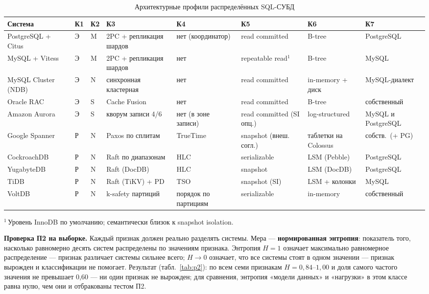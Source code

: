 \documentclass{misisarticle}
\begin{document}
\begin{table}[t]
\caption{Архитектурные профили распределённых SQL-СУБД}\label{tab:profiles}
\centering
\scriptsize
\setlength{\tabcolsep}{3.5pt}
\begin{tabular}{llllllll}
\toprule
\textbf{Система} & \textbf{К1} & \textbf{К2} & \textbf{К3} & \textbf{К4} & \textbf{К5} & \textbf{К6} & \textbf{К7} \\
\midrule
PostgreSQL + Citus~\cite{citus} & Э & M & 2PC + репликация шардов & нет (координатор) & read committed & B-tree & PostgreSQL \\
MySQL + Vitess~\cite{vitess} & Э & M & 2PC + репликация шардов & нет & repeatable read$^{1}$ & B-tree & MySQL \\
MySQL Cluster (NDB) & Э & N & синхронная кластерная & нет & read committed & in-memory + диск & MySQL-диалект \\
Oracle RAC & Э & S & Cache Fusion & нет & read committed & B-tree & собственный \\
Amazon Aurora~\cite{aurora} & Э & S & кворум записи 4/6 & нет (в зоне записи) & read committed (SI опц.) & log-structured & MySQL и PostgreSQL \\
Google Spanner~\cite{spanner} & Р & N & Paxos по сплитам & TrueTime & snapshot (внеш. согл.) & таблетки на Colossus & собств.\ (+ PG) \\
CockroachDB~\cite{crdb} & Р & N & Raft по диапазонам & HLC & serializable & LSM (Pebble) & PostgreSQL \\
YugabyteDB~\cite{yugabyte} & Р & N & Raft (DocDB) & HLC & snapshot & LSM (DocDB) & PostgreSQL \\
TiDB~\cite{tidb} & Р & N & Raft (TiKV) + PD & TSO & snapshot (SI) & LSM + колонки & MySQL \\
VoltDB & Р & N & k-safety партиций & порядок по партициям & serializable & in-memory & собственный \\
\bottomrule
\end{tabular}

{\footnotesize $^{1}$\,Уровень InnoDB по умолчанию; семантически близок к snapshot isolation.}
\end{table}

\textbf{Проверка П2 на выборке.} Каждый признак должен реально разделять системы. Мера --- \textbf{нормированная энтропия}: показатель того, насколько равномерно десять систем распределены по значениям признака. Энтропия $H=1$ означает максимально равномерное распределение --- признак различает системы сильнее всего; $H\to 0$ означает, что все системы стоят в одном значении --- признак вырожден и классификации не помогает. Результат (табл.~\ref{tab:p2}): по всем семи признакам $H=0{,}84$--$1{,}00$ и доля самого частого значения не превышает 0,60 --- ни один признак не вырожден; для сравнения, энтропия «модели данных» и «нагрузки» в этом классе равна нулю, чем они и отбракованы тестом П2.
\end{document}
